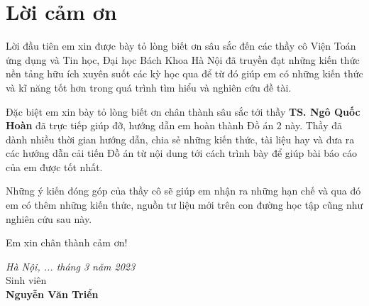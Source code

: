 \newpage
{}
\chapter*{Lời cảm ơn}
    Lời đầu tiên em xin được bày tỏ lòng biết ơn sâu sắc đến các thầy cô Viện Toán ứng dụng và Tin học, Đại học Bách Khoa Hà Nội đã truyền đạt những kiến thức nền tảng hữu ích xuyên suốt các kỳ học qua để từ đó giúp em có những kiến thức và kĩ năng tốt hơn trong quá trình tìm hiểu và nghiên cứu đề tài.
    
    Đặc biệt em xin bày tỏ lòng biết ơn chân thành sâu sắc tới thầy \textbf{TS. Ngô Quốc Hoàn} đã trực tiếp giúp đỡ, hướng dẫn em hoàn thành Đồ án 2 này. Thầy đã dành nhiều thời gian hướng dẫn, chia sẻ những kiến thức, tài liệu hay và đưa ra các hướng dẫn cải tiến Đồ án từ nội dung tới cách trình bày để giúp bài báo cáo của em được tốt nhất.
    
    Những ý kiến đóng góp của thầy cô sẽ giúp em nhận ra những hạn chế và qua đó em có thêm những kiến thức, nguồn tư liệu mới trên con đường học tập cũng như nghiên cứu sau này.
    
    Em xin chân thành cảm ơn!
    
\vspace{1.5cm}
\hspace{0.5\textwidth}
\begin{minipage}{0.5\textwidth}
	\noindent\begin{center}
		\textit{Hà Nội, ... tháng 3 năm 2023} \\
		Sinh viên\\ \vspace{2cm}
		\textbf{Nguyễn Văn Triển} \\
	\end{center}	
\end{minipage}
\newpage
